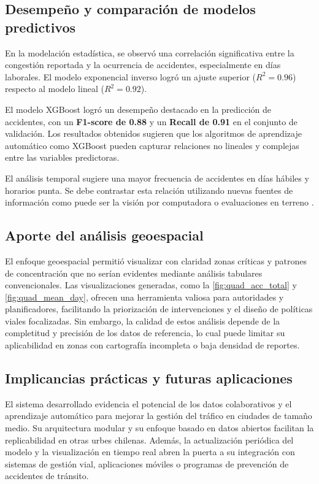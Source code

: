 \documentclass[12pt]{article}
\begin{document}
\subsection{Desempeño y comparación de modelos predictivos}

En la modelación estadística, se observó una correlación significativa entre la congestión reportada y la ocurrencia de accidentes, especialmente en días laborales. El modelo exponencial inverso logró un ajuste superior ($R^2 = 0.96$) respecto al modelo lineal ($R^2 = 0.92$).

El modelo XGBoost logró un desempeño destacado en la predicción de accidentes, con un \textbf{F1-score de 0.88} y un \textbf{Recall de 0.91} en el conjunto de validación. Los resultados obtenidos sugieren que los algoritmos de aprendizaje automático como XGBoost pueden capturar relaciones no lineales y complejas entre las variables predictoras.

El análisis temporal sugiere una mayor frecuencia de accidentes en días hábiles y horarios punta. Se debe contrastar esta relación utilizando nuevas fuentes de información como puede ser la visión por computadora o evaluaciones en terreno \parencite{goodall2019}.

\subsection{Aporte del análisis geoespacial}

El enfoque geoespacial permitió visualizar con claridad zonas críticas y patrones de concentración que no serían evidentes mediante análisis tabulares convencionales. Las visualizaciones generadas, como la \autoref{fig:quad_acc_total} y \autoref{fig:quad_mean_day}, ofrecen una herramienta valiosa para autoridades y planificadores, facilitando la priorización de intervenciones y el diseño de políticas viales focalizadas. Sin embargo, la calidad de estos análisis depende de la completitud y precisión de los datos de referencia, lo cual puede limitar su aplicabilidad en zonas con cartografía incompleta o baja densidad de reportes.

\subsection{Implicancias prácticas y futuras aplicaciones}

El sistema desarrollado evidencia el potencial de los datos colaborativos y el aprendizaje automático para mejorar la gestión del tráfico en ciudades de tamaño medio. Su arquitectura modular y su enfoque basado en datos abiertos facilitan la replicabilidad en otras urbes chilenas. Además, la actualización periódica del modelo y la visualización en tiempo real abren la puerta a su integración con sistemas de gestión vial, aplicaciones móviles o programas de prevención de accidentes de tránsito.
\end{document}
